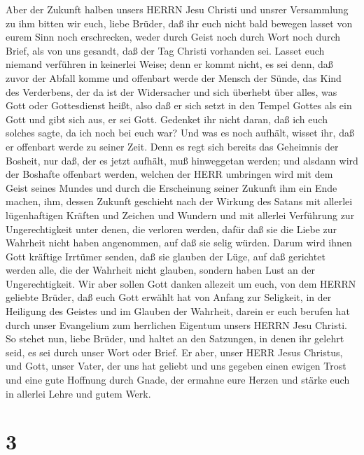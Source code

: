  Aber der Zukunft halben unsers HERRN Jesu Christi und
unsrer Versammlung zu ihm bitten wir euch, liebe Brüder, 
daß ihr euch nicht bald bewegen lasset von eurem Sinn noch erschrecken,
weder durch Geist noch durch Wort noch durch Brief, als von uns gesandt,
daß der Tag Christi vorhanden sei.  Lasset euch niemand
verführen in keinerlei Weise; denn er kommt nicht, es sei denn, daß
zuvor der Abfall komme und offenbart werde der Mensch der Sünde, das
Kind des Verderbens,  der da ist der Widersacher und sich
überhebt über alles, was Gott oder Gottesdienst heißt, also daß er sich
setzt in den Tempel Gottes als ein Gott und gibt sich aus, er sei Gott.
 Gedenket ihr nicht daran, daß ich euch solches sagte, da
ich noch bei euch war?  Und was es noch aufhält, wisset ihr,
daß er offenbart werde zu seiner Zeit.  Denn es regt sich
bereits das Geheimnis der Bosheit, nur daß, der es jetzt aufhält, muß
hinweggetan werden;  und alsdann wird der Boshafte offenbart
werden, welchen der HERR umbringen wird mit dem Geist seines Mundes und
durch die Erscheinung seiner Zukunft ihm ein Ende machen, 
ihm, dessen Zukunft geschieht nach der Wirkung des Satans mit allerlei
lügenhaftigen Kräften und Zeichen und Wundern  und mit
allerlei Verführung zur Ungerechtigkeit unter denen, die verloren
werden, dafür daß sie die Liebe zur Wahrheit nicht haben angenommen, auf
daß sie selig würden.  Darum wird ihnen Gott kräftige
Irrtümer senden, daß sie glauben der Lüge,  auf daß
gerichtet werden alle, die der Wahrheit nicht glauben, sondern haben
Lust an der Ungerechtigkeit.  Wir aber sollen Gott danken
allezeit um euch, von dem HERRN geliebte Brüder, daß euch Gott erwählt
hat von Anfang zur Seligkeit, in der Heiligung des Geistes und im
Glauben der Wahrheit,  darein er euch berufen hat durch
unser Evangelium zum herrlichen Eigentum unsers HERRN Jesu Christi.
 So stehet nun, liebe Brüder, und haltet an den Satzungen,
in denen ihr gelehrt seid, es sei durch unser Wort oder Brief.
 Er aber, unser HERR Jesus Christus, und Gott, unser Vater,
der uns hat geliebt und uns gegeben einen ewigen Trost und eine gute
Hoffnung durch Gnade,  der ermahne eure Herzen und stärke
euch in allerlei Lehre und gutem Werk.

\hypertarget{section-2}{%
\section{3}\label{section-2}}

